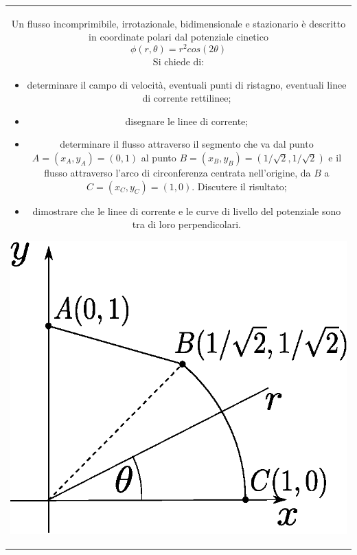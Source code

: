 \begin{tabular}{c}
\begin{minipage}[c]{0.6\textwidth}
 \begin{exerciseS}
  Un flusso incomprimibile, irrotazionale, bidimensionale 
  e stazionario è descritto in coordinate polari dal potenziale cinetico
  \begin{equation*}
    \phi(r,\theta) = r^{2} cos(2 \theta)
  \end{equation*}
  Si chiede di:
  \begin{itemize}
    \item determinare il campo di velocità, eventuali punti di ristagno, 
          eventuali linee di corrente rettilinee;
    \item disegnare le linee di corrente;
    \item determinare il flusso attraverso il segmento che va dal punto 
          $A=(x_A,y_A)=
          (0,1)$ al punto $B=(x_B,y_B)=(1/\sqrt{2},1/\sqrt{2})$ e il 
          flusso attraverso l'arco di circonferenza centrata nell'origine,
          da $B$ a $C=(x_C,y_C)=(1,0)$. Discutere il risultato;
    \item dimostrare che le linee di corrente e le curve di livello del
          potenziale sono tra di loro perpendicolari.
  \end{itemize}
  \end{exerciseS}
\end{minipage}
\begin{minipage}[c]{0.35\textwidth}
   \begin{center}
   \includegraphics[width=1.00\textwidth]{./fig/piano2.eps}
   \end{center}
\end{minipage}
\end{tabular}


